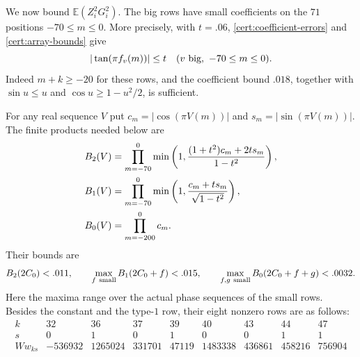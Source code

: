 We now bound $\mathbb E(Z_i^2G_i^2)$.  The big rows have small
coefficients on the $71$ positions $-70\le m\le0$.  More precisely,
with $t=.06$, \eqref{cert:coefficient-errors} and
\eqref{cert:array-bounds} give
\begin{equation}\label{cert:tangent-bound}
 |\tan(\pi f_v(m))|\le t
 \quad(v\hbox{ big},\ -70\le m\le0).
\end{equation}
Indeed $m+k\ge-20$ for these rows, and the coefficient bound $.018$,
together with $\sin u\le u$ and $\cos u\ge1-u^2/2$, is sufficient.

For any real sequence $V$ put $c_m=|\cos(\pi V(m))|$ and
$s_m=|\sin(\pi V(m))|$.  The finite products needed below are
\begin{align}
 B_2(V)&=\prod_{m=-70}^0
  \min\left(1,\frac{(1+t^2)c_m+2ts_m}{1-t^2}\right),\notag\\
 B_1(V)&=\prod_{m=-70}^0
  \min\left(1,\frac{c_m+ts_m}{\sqrt{1-t^2}}\right),\label{cert:B-def}\\
 B_0(V)&=\prod_{m=-200}^0c_m.\notag
\end{align}
Their bounds are
\begin{equation}\label{cert:B-bounds}
 B_2(2C_0)<.011,\qquad
 \max_{f\ {\rm small}}B_1(2C_0+f)<.015,\qquad
 \max_{f,g\ {\rm small}}B_0(2C_0+f+g)<.0032.
\end{equation}
Here the maxima range over the actual phase sequences of the small
rows.  Besides the constant and the type-$1$ row, their eight
nonzero rows are as follows:
\[
\begin{array}{c|rrrrrrrr}
 k&32&36&37&39&40&43&44&47\\
 s&0&1&0&1&0&0&1&1\\
 Ww_{ks}&-536932&1265024&331701&47119&1483338&436861&458216&756904
\end{array}
\]

